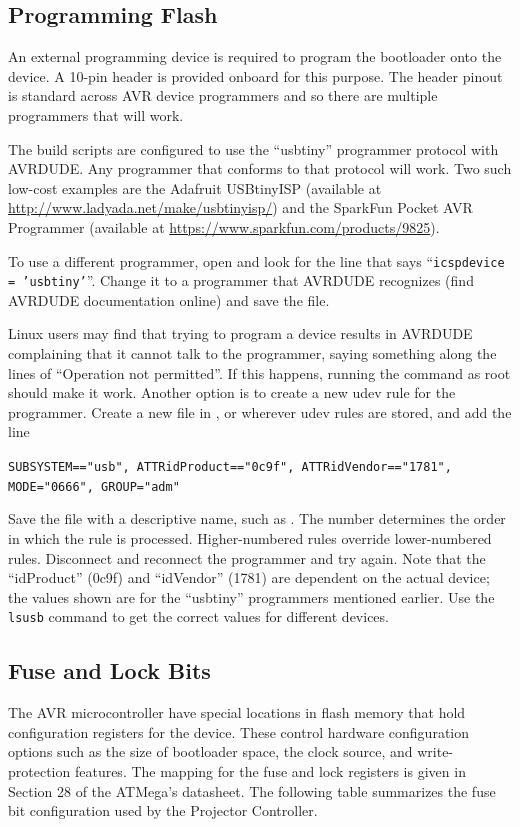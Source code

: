 \documentclass{article}
\begin{document}
\subsection{Programming Flash} \label{ssec:FWProgFlash}
An external programming device is required to program the bootloader onto the device.  A 10-pin
header is provided onboard for this purpose.  The header pinout is standard across AVR device
programmers and so there are multiple programmers that will work.  

The build scripts are configured to use the ``usbtiny'' programmer protocol with AVRDUDE.  Any
programmer that conforms to that protocol will work.  Two such low-cost examples are the Adafruit
USBtinyISP (available at \url{http://www.ladyada.net/make/usbtinyisp/}) and the SparkFun Pocket AVR
Programmer (available at \url{https://www.sparkfun.com/products/9825}).

To use a different programmer, open  and look for the line
that says ``\texttt{icspdevice = 'usbtiny'}''.  Change it to a programmer that AVRDUDE recognizes (find
AVRDUDE documentation online) and save the file.

Linux users may find that trying to program a device results in AVRDUDE complaining that it cannot
talk to the programmer, saying something along the lines of ``Operation not permitted''.  If this
happens, running the command as root should make it work.  Another option is to create a new udev
rule for the programmer.  Create a new file in , or wherever udev rules
are stored, and add the line

\texttt{SUBSYSTEM=="usb", ATTR{idProduct}=="0c9f", ATTR{idVendor}=="1781", MODE="0666", GROUP="adm"}

Save the file with a descriptive name, such as .  The number determines the
order in which the rule is processed.  Higher-numbered rules override lower-numbered rules.
Disconnect and reconnect the programmer and try again.  Note that the ``idProduct'' (0c9f) and
``idVendor'' (1781) are dependent on the actual device; the values shown are for the ``usbtiny''
programmers mentioned earlier.  Use the \texttt{lsusb} command to get the correct values for
different devices.

\subsection{Fuse and Lock Bits} \label{ssec:FWFuseBits}
The AVR microcontroller have special locations in flash memory that hold configuration registers for
the device.  These control hardware configuration options such as the size of bootloader space, the
clock source, and write-protection features.  The mapping for the fuse and lock registers is given
in Section 28 of the ATMega's datasheet.  The following table summarizes the fuse bit configuration
used by the Projector Controller.
\end{document}
